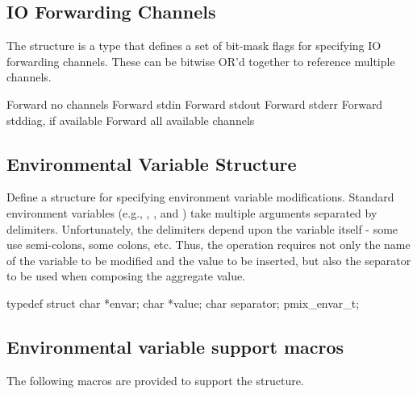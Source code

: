 \subsection{IO Forwarding Channels}

The  structure is a  type that defines a set of bit-mask flags for specifying IO forwarding channels. These can be bitwise OR'd together to reference multiple channels.

\begin{constantdesc}
%
Forward no channels
%
Forward stdin
%
Forward stdout
%
Forward stderr
%
Forward stddiag, if available
%
Forward all available channels
%
\end{constantdesc}


\subsection{Environmental Variable Structure}

Define a structure for specifying environment variable modifications.
Standard environment variables (e.g., , , and )
take multiple arguments separated by delimiters. Unfortunately, the delimiters
depend upon the variable itself - some use semi-colons, some colons, etc. Thus,
the operation requires not only the name of the variable to be modified and
the value to be inserted, but also the separator to be used when composing
the aggregate value.

\cspecificstart
\begin{codepar}
typedef struct {
    char *envar;
    char *value;
    char separator;
} pmix_envar_t;
\end{codepar}
\cspecificend


\subsection{Environmental variable support macros}

The following macros are provided to support the  structure.

